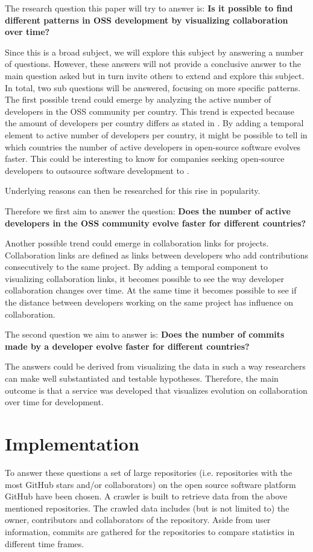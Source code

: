 \documentclass[acmtog, authorversion]{acmart}
\begin{document}
The research question this paper will try to answer is: \textbf{Is it possible to find different patterns in OSS development by visualizing collaboration over time?}

Since this is a broad subject, we will explore this subject by answering a number of questions.
However, these answers will not provide a conclusive answer to the main question asked but in turn invite others to extend and explore this subject.
In total, two sub questions will be answered, focusing on more specific patterns.
The first possible trend could emerge by analyzing the active number of developers in the OSS community per country.
This trend is expected because the amount of developers per country differs as stated in \cite{StackOverflow2017}.
By adding a temporal element to active number of developers per country, it might be possible to tell in which countries the number of active developers in open-source software evolves faster.
This could be interesting to know for companies seeking open-source developers to outsource software development to \cite{haefliger2008code}.

Underlying reasons can then be researched for this rise in popularity.

Therefore we first aim to answer the question: \textbf{Does the number of active developers in the OSS community evolve faster for different countries?}

Another possible trend could emerge in collaboration links for projects.
Collaboration links are defined as links between developers who add contributions consecutively to the same project.
By adding a temporal component to visualizing collaboration links, it becomes possible to see the way developer collaboration changes over time.
At the same time it becomes possible to see if the distance between developers working on the same project has influence on collaboration.

The second question we aim to answer is: \textbf{Does the number of commits made by a developer evolve faster for different countries?}

The answers could be derived from visualizing the data in such a way researchers can make well substantiated and testable hypotheses. 
Therefore, the main outcome is that a service was developed that visualizes evolution on collaboration over time for development.

\section{Implementation}
To answer these questions a set of large repositories (i.e. repositories with the most GitHub stars and/or collaborators) on the open source software platform GitHub have been chosen.
A crawler is built to retrieve data from the above mentioned repositories.
The crawled data includes (but is not limited to) the owner, contributors and collaborators of the repository.
Aside from user information, commits are gathered for the repositories to compare statistics in different time frames.
\end{document}
